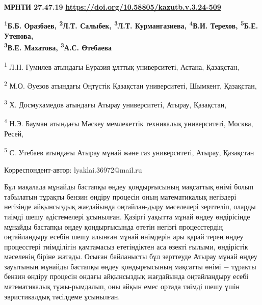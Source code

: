 \newpage
{\bfseries МРНТИ 27.47.19}
\hfill {\bfseries \href{https://doi.org/10.58805/kazutb.v.3.24-509}{https://doi.org/10.58805/kazutb.v.3.24-509}}


\begin{center}
{\bfseries \textsuperscript{1}Б.Б. Оразбаев, \textsuperscript{2}Л.Т.
Салыбек\envelope, \textsuperscript{3}Л.Т. Курмангазиева,
\textsuperscript{4}В.И. Терехов, \textsuperscript{5}Б.Е. Утенова, 
\\\textsuperscript{3}В.Е. Махатова, \textsuperscript{3}А.С.
Өтебаева}

\textsuperscript{1} Л.Н. Гумилев атындағы Еуразия ұлттық университеті,
Астана, Қазақстан,

\textsuperscript{2} М.О. Әуезов атындағы Оңтүстік Қазақстан
университеті, Шымкент, Қазақстан,

\textsuperscript{3} Х. Досмухамедов атындағы Атырау университеті,
Атырау, Қазақстан,

\textsuperscript{4} Н.Э. Бауман атындағы Мәскеу мемлекеттік техникалық
университеті, Москва, Ресей,

\textsuperscript{5} С. Утебаев атындағы Атырау мұнай
және газ университеті, Атырау, Қазақстан
\end{center}
\envelope Корреспондент-автор: lyaklai.36972@mail.ru \vspace{0.5cm}

Бұл мақалада мұнайды бастапқы өңдеу қондырғысының мақсаттық өнімі болып
табылатын тұрақты бензин өндіру процесін оның математикалық негіздері
негізінде айқынсыздық жағдайында оңтайлан-дыру мәселелері зерттеліп,
оларды тиімді шешу әдістемелері ұсынылған. Қазіргі уақытта мұнай өңдеу
өндірісінде мұнайды бастапқы өңдеу қондырғысында өтетін негізгі
процесстердің оңтайландыру есебін шешу алынған мұнай өнімдерін ары
қарай терең өңдеу процесстері тиімділігін қамтамасыз ететіндіктен аса
өзекті ғылыми, өндірістік мәселенің біріне жатады. Осыған байланысты бұл
зерттеуде Атырау мұнай өңдеу зауытының мұнайды бастапқы өңдеу
қондырғысының мақсатты өнімі − тұрақты бензин өндіру процесін ондағы
айқынсыздық жағдайында оңтайландыру есебі математикалық тұжы-рымдалып,
оны айқын емес ортада тиімді шешу үшін эвристикалдық тәсілдеме
ұсынылған.

